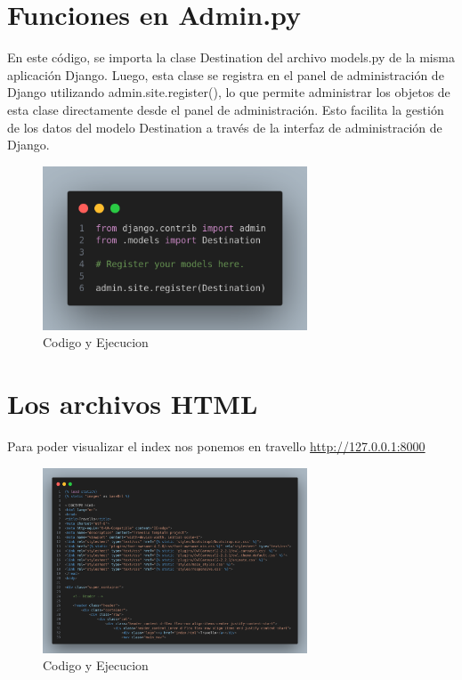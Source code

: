 \documentclass[10pt, a4paper]{article}
\begin{document}
\section{Funciones en Admin.py}
En este código, se importa la clase Destination del archivo models.py de la misma aplicación Django. Luego, esta clase se registra en el panel de administración de Django utilizando admin.site.register(), lo que permite administrar los objetos de esta clase directamente desde el panel de administración. Esto facilita la gestión de los datos del modelo Destination a través de la interfaz de administración de Django.
\begin{figure}[H]
  \centering
  \includegraphics[width=0.7\textwidth]{img/admin-travello.png}
  \caption{Codigo y Ejecucion}
\end{figure}

\section{Los archivos HTML}
Para poder visualizar el index nos ponemos en
travello \href{http://127.0.0.1:8000}{http://127.0.0.1:8000}

\begin{figure}[H]
  \centering
  \includegraphics[width=0.7\textwidth]{img/index-html.png}
  \caption{Codigo y Ejecucion}
\end{figure}
\end{document}
